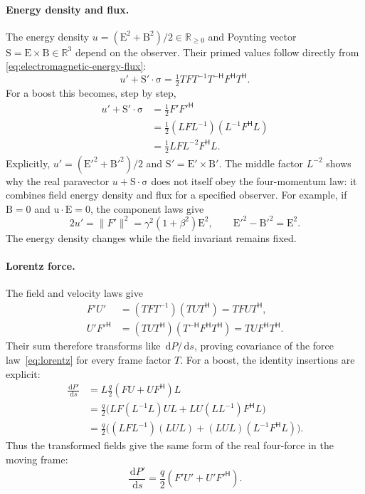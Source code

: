 \documentclass[11pt]{article}
\newcommand{\pv}[1]{{#1}}
\newcommand{\vstyle}[1]{{\bm{\mathrm{#1}}}}
\newcommand{\pF}{\pv{F}}
\newcommand{\pL}{\pv{L}}
\newcommand{\pP}{\pv{P}}
\newcommand{\pT}{\pv{T}}
\newcommand{\pU}{\pv{U}}
\numberwithin{equation}{section}
\newcommand{\R}{\mathbb{R}}
\newcommand{\dotprod}{\cdot}
\newcommand{\bsig}{\vstyle{\sigma}}
\newcommand{\bu}{\vstyle{u}}
\newcommand{\bS}{\vstyle{S}}
\newcommand{\bE}{\vstyle{E}}
\newcommand{\bBf}{\vstyle{B}}
\newcommand{\dd}{\,\mathrm d}
\begin{document}
\paragraph{Energy density and flux.}
The energy density $u=(\bE^2+\bBf^2)/2\in\R_{\ge0}$ and Poynting vector
$\bS=\bE\times\bBf\in\R^3$ depend on the observer.
Their primed values follow directly from
\eqref{eq:electromagnetic-energy-flux}:
\[
 \boxed{u'+\bS'\dotprod\bsig
 =\tfrac12\pT\pF\pT^{-1}\pT^{-\mathsf H}
 \pF^{\mathsf H}\pT^{\mathsf H}.}
\]
For a boost this becomes, step by step,
\begin{align*}
 u'+\bS'\dotprod\bsig
 &=\tfrac12\pF'\pF'^{\mathsf H}\\
 &=\tfrac12(\pL\pF\pL^{-1})(\pL^{-1}\pF^{\mathsf H}\pL)\\
 &=\tfrac12\pL\pF\pL^{-2}\pF^{\mathsf H}\pL.
\end{align*}
Explicitly, $u'=(\bE'^2+\bBf'^2)/2$ and $\bS'=\bE'\times\bBf'$.
The middle factor $\pL^{-2}$ shows why the real paravector
$u+\bS\dotprod\bsig$ does not itself obey the four-momentum law:
it combines field energy density and flux for a specified observer.
For example, if $\bBf=0$ and $\bu\dotprod\bE=0$, the component laws give
\[
 2u'=\lVert\pF'\rVert^2=\gamma^2(1+\beta^2)\bE^2,
 \qquad \bE'^2-\bBf'^2=\bE^2.
\]
The energy density changes while the field invariant remains fixed.

\paragraph{Lorentz force.}
The field and velocity laws give
\begin{align*}
 \pF'\pU'&=(\pT\pF\pT^{-1})(\pT\pU\pT^{\mathsf H})
 =\pT\pF\pU\pT^{\mathsf H},\\
 \pU'\pF'^{\mathsf H}
 &=(\pT\pU\pT^{\mathsf H})(\pT^{-\mathsf H}\pF^{\mathsf H}\pT^{\mathsf H})
 =\pT\pU\pF^{\mathsf H}\pT^{\mathsf H}.
\end{align*}
Their sum therefore transforms like $\dd\pP/\dd s$, proving covariance
of the force law~\eqref{eq:lorentz} for every frame factor $\pT$.
For a boost, the identity insertions are explicit:
\begin{align*}
 \frac{\dd\pP'}{\dd s}
 &=\pL\frac q2(\pF\pU+\pU\pF^{\mathsf H})\pL\\
 &=\frac q2\bigl(\pL\pF(\pL^{-1}\pL)\pU\pL
 +\pL\pU(\pL\pL^{-1})\pF^{\mathsf H}\pL\bigr)\\
 &=\frac q2\bigl((\pL\pF\pL^{-1})(\pL\pU\pL)
 +(\pL\pU\pL)(\pL^{-1}\pF^{\mathsf H}\pL)\bigr).
\end{align*}
Thus the transformed fields give the same form of the real four-force
in the moving frame:
\[
 \boxed{\frac{\dd\pP'}{\dd s}
 =\frac q2(\pF'\pU'+\pU'\pF'^{\mathsf H}).}
\]
\end{document}
